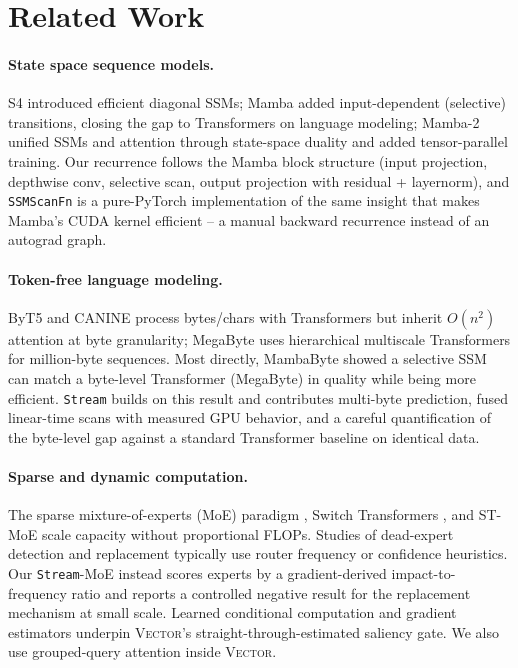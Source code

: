 \documentclass[11pt]{article}
\newcommand{\Stream}{\texttt{Stream}}
\newcommand{\Vector}{{\scshape Vector}}
\begin{document}
\section{Related Work}\label{sec:related}

\paragraph{State space sequence models.}
S4 \cite{Gu2021S4} introduced efficient diagonal SSMs; Mamba \cite{GuDao2023Mamba}
added input-dependent (selective) transitions, closing the gap to Transformers
on language modeling; Mamba-2 \cite{DaoGu2024Mamba2} unified SSMs and attention
through state-space duality and added tensor-parallel training. Our recurrence
follows the Mamba block structure (input projection, depthwise conv, selective
scan, output projection with residual + layernorm), and \texttt{SSMScanFn} is a
pure-PyTorch implementation of the same insight that makes Mamba's CUDA kernel
efficient -- a manual backward recurrence instead of an autograd graph.

\paragraph{Token-free language modeling.}
ByT5 \cite{Xue2021ByT5} and CANINE \cite{Clark2022CANINE} process bytes/chars
with Transformers but inherit $O(n^2)$ attention at byte granularity; MegaByte
\cite{Yu2023MegaByte} uses hierarchical multiscale Transformers for
million-byte sequences. Most directly, MambaByte \cite{Wang2024MambaByte}
showed a selective SSM can match a byte-level Transformer (MegaByte) in quality
while being more efficient. \Stream{} builds on this result and contributes
multi-byte prediction, fused linear-time scans with measured GPU behavior, and
a careful quantification of the byte-level gap against a standard Transformer
baseline on identical data.

\paragraph{Sparse and dynamic computation.}
The sparse mixture-of-experts (MoE) paradigm \cite{Shazeer2017MoE},
Switch Transformers \cite{Fedus2021Switch}, and ST-MoE \cite{Zoph2022STMoE}
scale capacity without proportional FLOPs. Studies of dead-expert detection and
replacement \cite{Roller2021Evolving,Kim2023Expert} typically use router
frequency or confidence heuristics. Our \Stream{}-MoE instead scores experts by
a gradient-derived impact-to-frequency ratio and reports a controlled negative
result for the replacement mechanism at small scale. Learned conditional
computation and gradient estimators \cite{Bengio2013STE} underpin \Vector{}'s
straight-through-estimated saliency gate. We also use grouped-query attention
\cite{Ainslie2023GQA} inside \Vector{}.
\end{document}
